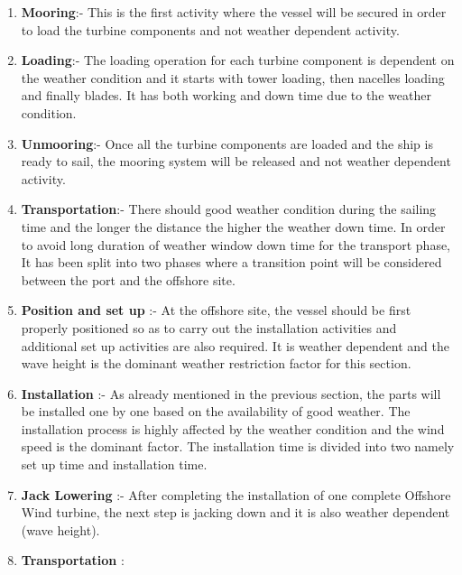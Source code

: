 \begin{enumerate}
\item \textbf{Mooring}:- This is the first activity where the vessel will be secured in order to load the turbine components and not weather dependent activity.
\item \textbf{Loading}:- The loading operation for each turbine component is dependent on the weather condition and it starts with tower loading, then nacelles loading and finally blades. It has both working and down time due to the weather condition.
\item \textbf{Unmooring}:- Once all the turbine components are loaded and the ship is ready to sail, the mooring system will be released and not weather dependent activity.
\item \textbf{Transportation}:- There should good weather condition during the sailing time and the longer the distance the higher the weather down time. In order to avoid long duration of weather window down time  for the transport phase, It has been split into two phases where a transition point will be considered between the port and the offshore site.
\item \textbf{Position and set up} :- At the offshore site, the vessel should be first properly positioned so as to carry out the installation activities and  additional set up activities are also required. It is weather dependent and the wave height is the dominant weather restriction factor for this section.

\item \textbf{Installation} :- As already mentioned in the previous section, the parts will be installed one by one based on the availability of good weather. The installation process is highly affected by the weather condition and the wind speed is the dominant factor. The installation time is  divided into two namely set up time and installation time. 
\item \textbf{Jack Lowering} :- After completing the installation of one complete Offshore Wind turbine, the next step is jacking down and it is also weather dependent (wave height).
\item \textbf{Transportation} :

\end{enumerate}